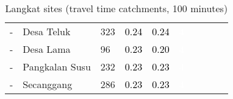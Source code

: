 \begin{table}[ht]
\begin{tabular}{C{0.03\textwidth}C{0.12\textwidth}C{0.09\textwidth}C{0.08\textwidth}C{0.08\textwidth}C{0.08\textwidth}C{0.07\textwidth}C{0.07\textwidth}C{0.07\textwidth}C{0.07\textwidth}}
  {-} & Desa Teluk & 323 & \textcolor[HTML]{000000}{0.24} & \textcolor[HTML]{000000}{0.24} & \textcolor[HTML]{FFFFFF}{4} &  &  &  &  \\ 
  {-} & Desa Lama &  96 & \textcolor[HTML]{000000}{0.23} & \textcolor[HTML]{000000}{0.20} & \textcolor[HTML]{FFFFFF}{4} &  &  &  &  \\ 
  {-} & Pangkalan Susu & 232 & \textcolor[HTML]{000000}{0.23} & \textcolor[HTML]{000000}{0.23} & \textcolor[HTML]{FFFFFF}{4} &  &  &  &  \\ 
  {-} & Secanggang & 286 & \textcolor[HTML]{000000}{0.23} & \textcolor[HTML]{000000}{0.23} & \textcolor[HTML]{FFFFFF}{4} &  &  &  &  \\ 
  \end{tabular}
\endgroup
\caption{Langkat sites (travel time catchments, 100 minutes)} 
\label{tab:langkat_time}
\end{table}
